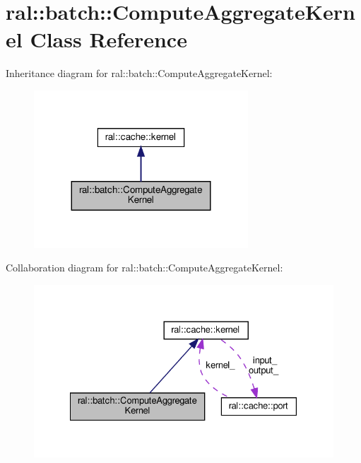 \hypertarget{classral_1_1batch_1_1ComputeAggregateKernel}{}\section{ral\+:\+:batch\+:\+:Compute\+Aggregate\+Kernel Class Reference}
\label{classral_1_1batch_1_1ComputeAggregateKernel}


Inheritance diagram for ral\+:\+:batch\+:\+:Compute\+Aggregate\+Kernel\+:\nopagebreak
\begin{figure}[H]
\begin{center}
\leavevmode
\includegraphics[width=227pt]{classral_1_1batch_1_1ComputeAggregateKernel__inherit__graph}
\end{center}
\end{figure}


Collaboration diagram for ral\+:\+:batch\+:\+:Compute\+Aggregate\+Kernel\+:\nopagebreak
\begin{figure}[H]
\begin{center}
\leavevmode
\includegraphics[width=328pt]{classral_1_1batch_1_1ComputeAggregateKernel__coll__graph}
\end{center}
\end{figure}
